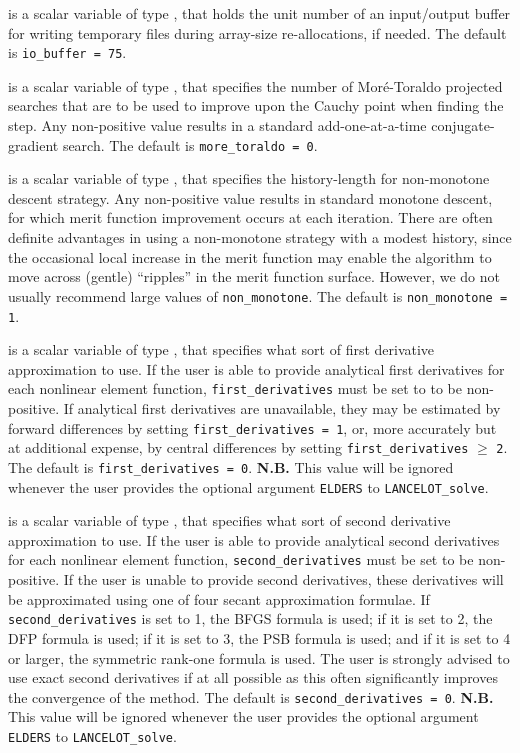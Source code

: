 \documentclass{galahad}
\newcommand{\fullpackagename}{LANC\-E\-LOT}
\newcommand{\solver}{{\tt \fullpackagename\_solve}}
\begin{document}
\begin{description}
 is a scalar variable of type \integer, that holds
the unit number of an input/output buffer for writing temporary files
during array-size re-allocations, if needed.
The default is {\tt io\_buffer = 75}.

 is a scalar variable of type \integer, that
specifies the number of Mor\'{e}-Toraldo projected searches
that are to be used to improve upon the Cauchy point when finding the
step. Any non-positive value results in a standard add-one-at-a-time
conjugate-gradient search.
The default is {\tt more\_toraldo = 0}.

 is a scalar variable of type \integer, that
specifies the history-length for non-monotone descent strategy.
Any non-positive value results in standard monotone descent, for which
merit function improvement occurs at each iteration. There are often
definite advantages in using a non-monotone strategy with a modest history,
since the occasional local increase in the merit function may
enable the algorithm to move across (gentle) ``ripples'' in
the merit function surface.
However, we do not usually recommend large values of {\tt non\_monotone}.
The default is {\tt non\_monotone = 1}.

 is a scalar variable of type \integer,
that specifies what sort of first derivative
approximation to use. If the user is able to provide
analytical first derivatives for each nonlinear
element function, {\tt first\_derivatives} must be set to
to be non-positive. If analytical first derivatives are unavailable,
they may be estimated by forward differences by setting
{\tt first\_derivatives = 1}, or, more accurately but at additional expense,
by central differences by setting {\tt first\_derivatives} $\geq$ {\tt 2}.
The default is {\tt first\_derivatives = 0}.
{\bf N.B.} This value will be ignored whenever the user provides the
optional argument {\tt ELDERS} to \solver.

 is a scalar variable of type \integer,
that specifies what sort of second derivative
approximation to use. If the user is able to
provide analytical second derivatives for each nonlinear element function,
{\tt second\_derivatives} must be set to be non-positive. If the
user is unable to provide second derivatives, these
derivatives will be approximated using one of four
secant approximation formulae. If {\tt second\_derivatives} is set to
1, the BFGS formula is used; if it is set to 2, the DFP
formula is used; if it is set to 3, the PSB
formula is used; and if it is set to 4 or larger, the symmetric
rank-one formula is used. The user is strongly advised to
use exact second derivatives
if at all possible as this often
significantly improves the convergence of the method.
The default is {\tt second\_derivatives = 0}.
{\bf N.B.} This value will be ignored whenever the user provides the
optional argument {\tt ELDERS} to \solver.


\end{description}
\end{document}
